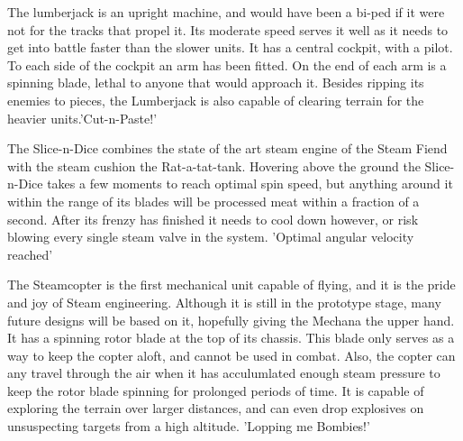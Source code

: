 \documentclass[a4paper,twocolumn]{article}
\begin{document}
The lumberjack is an upright machine, and would have been a bi-ped if it were not for the tracks that propel it. Its moderate speed serves it well as it needs to get into battle faster than the slower units. It has a central cockpit, with a pilot. To each side of the cockpit an arm has been fitted. On the end of each arm is a spinning blade, lethal to anyone that would approach it. Besides ripping its enemies to pieces, the Lumberjack is also capable of clearing terrain for the heavier units.'Cut-n-Paste!'

The Slice-n-Dice combines the state of the art steam engine of the Steam Fiend with the steam cushion the Rat-a-tat-tank. Hovering above the ground the Slice-n-Dice takes a few moments to reach optimal spin speed, but anything around it within the range of its blades will be processed meat within a fraction of a second. After its frenzy has finished it needs to cool down however, or risk blowing every single steam valve in the system. 'Optimal angular velocity reached'

The Steamcopter is the first mechanical unit capable of flying, and it is the pride and joy of Steam engineering. Although it is still in the prototype stage, many future designs will be based on it, hopefully giving the Mechana the upper hand. It has a spinning rotor blade at the top of its chassis. This blade only serves as a way to keep the copter aloft, and cannot be used in combat. Also, the copter can any travel through the air when it has acculumlated enough steam pressure to keep the rotor blade spinning for prolonged periods of time. It is capable of exploring the terrain over larger distances, and can even drop explosives on unsuspecting targets from a high altitude. 'Lopping me Bombies!'
\end{document}
